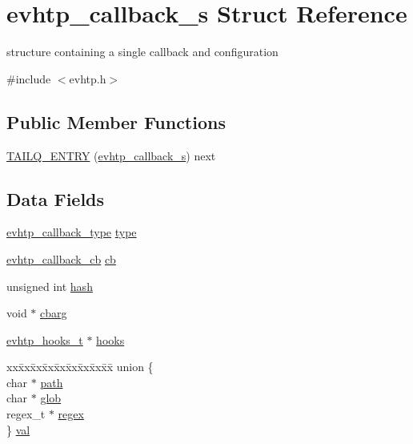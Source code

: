 \hypertarget{structevhtp__callback__s}{\section{evhtp\-\_\-callback\-\_\-s \-Struct \-Reference}
\label{structevhtp__callback__s}
}


structure containing a single callback and configuration  




{\ttfamily \#include $<$evhtp.\-h$>$}

\subsection*{\-Public \-Member \-Functions}
\begin{DoxyCompactItemize}
\item 
\hyperlink{structevhtp__callback__s_a868386a43f28c816f0e8e12f7c9aec7d}{\-T\-A\-I\-L\-Q\-\_\-\-E\-N\-T\-R\-Y} (\hyperlink{structevhtp__callback__s}{evhtp\-\_\-callback\-\_\-s}) next
\end{DoxyCompactItemize}
\subsection*{\-Data \-Fields}
\begin{DoxyCompactItemize}
\item 
\hyperlink{evhtp_8h_a6f45c416976c807084c7f71cb15c4f37}{evhtp\-\_\-callback\-\_\-type} \hyperlink{structevhtp__callback__s_a6da94264a51bd354aca3d22098a2aee5}{type}
\item 
\hyperlink{evhtp_8h_ae907dbe36b762aa2da912cedb57268d0}{evhtp\-\_\-callback\-\_\-cb} \hyperlink{structevhtp__callback__s_a783ee29046d4ff3e8c75f811e80fd57b}{cb}
\item 
unsigned int \hyperlink{structevhtp__callback__s_a09f9a9ce240560b1d191b42ed56af642}{hash}
\item 
void $\ast$ \hyperlink{structevhtp__callback__s_aafd3d1a6343925cb274875556a6faa0e}{cbarg}
\item 
\hyperlink{evhtp_8h_ac77d779459ec62f309d1fb09c5540786}{evhtp\-\_\-hooks\-\_\-t} $\ast$ \hyperlink{structevhtp__callback__s_ac97663394f74c9030e57c771cfb7981e}{hooks}
\item 
\begin{tabbing}
xx\=xx\=xx\=xx\=xx\=xx\=xx\=xx\=xx\=\kill
union \{\\
\>char $\ast$ \hyperlink{structevhtp__callback__s_a44196e6a5696d10442c29e639437196e}{path}\\
\>char $\ast$ \hyperlink{structevhtp__callback__s_ac921642f435071137acef3e073973b99}{glob}\\
\>regex\_t $\ast$ \hyperlink{structevhtp__callback__s_af71a3fad7fee5d731252ce89e56f948f}{regex}\\
\} \hyperlink{structevhtp__callback__s_a46fe687f5d6aa04ca3260318f08188b4}{val}\\

\end{tabbing}\end{DoxyCompactItemize}


